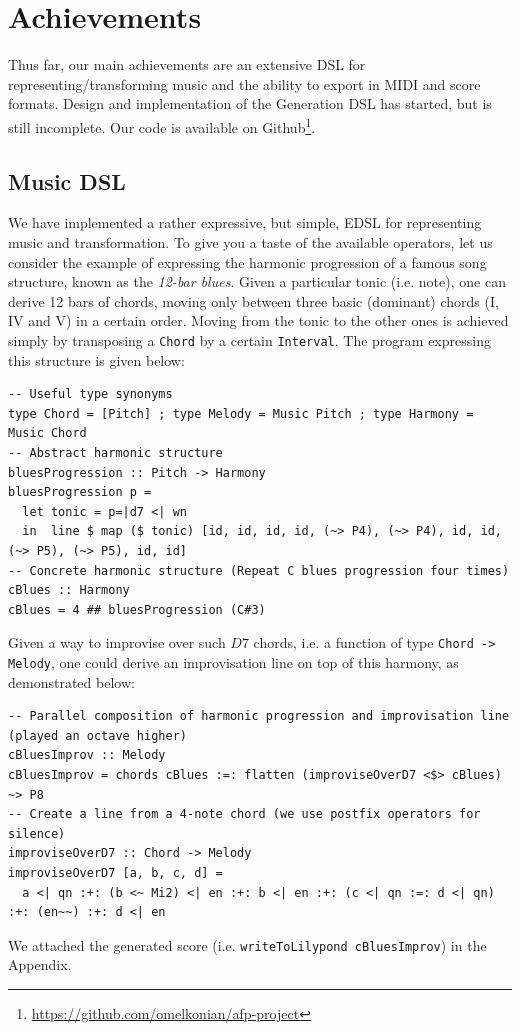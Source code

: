 \documentclass[11pt,a4paper]{article}
\newcommand{\site}[1]{\footnote{\url{#1}}}
\newcommand{\icode}[1]{\texttt{#1}}
\begin{document}
\section{Achievements}
Thus far, our main achievements are an extensive DSL for representing/transforming music and the ability to export in MIDI and score formats.
Design and implementation of the Generation DSL has started, but is still incomplete. Our code is available on Github\site{https://github.com/omelkonian/afp-project}.

\subsection{Music DSL}
We have implemented a rather expressive, but simple, EDSL for representing music and transformation. To give you a taste of the available operators, let us consider the example of expressing the harmonic progression of a famous song structure, known as the \textit{12-bar blues}. Given a particular tonic (i.e. note), one can derive 12 bars of chords, moving only between three basic (dominant) chords (I, IV and V) in a certain order. Moving from the tonic to the other ones is achieved simply by transposing a \icode{Chord} by a certain \icode{Interval}. The program expressing this structure is given below:
\begin{verbatim}
-- Useful type synonyms
type Chord = [Pitch] ; type Melody = Music Pitch ; type Harmony = Music Chord
-- Abstract harmonic structure
bluesProgression :: Pitch -> Harmony
bluesProgression p =
  let tonic = p=|d7 <| wn
  in  line $ map ($ tonic) [id, id, id, id, (~> P4), (~> P4), id, id, (~> P5), (~> P5), id, id]
-- Concrete harmonic structure (Repeat C blues progression four times)
cBlues :: Harmony
cBlues = 4 ## bluesProgression (C#3)
\end{verbatim}
Given a way to improvise over such $D7$ chords, i.e. a function of type \icode{Chord -> Melody}, one could derive an improvisation line on top of this harmony, as demonstrated below:
\begin{verbatim}
-- Parallel composition of harmonic progression and improvisation line (played an octave higher)
cBluesImprov :: Melody
cBluesImprov = chords cBlues :=: flatten (improviseOverD7 <$> cBlues) ~> P8
-- Create a line from a 4-note chord (we use postfix operators for silence)
improviseOverD7 :: Chord -> Melody
improviseOverD7 [a, b, c, d] =
  a <| qn :+: (b <~ Mi2) <| en :+: b <| en :+: (c <| qn :=: d <| qn) :+: (en~~) :+: d <| en
\end{verbatim}
We attached the generated score (i.e. \icode{writeToLilypond cBluesImprov}) in the Appendix.
\end{document}
